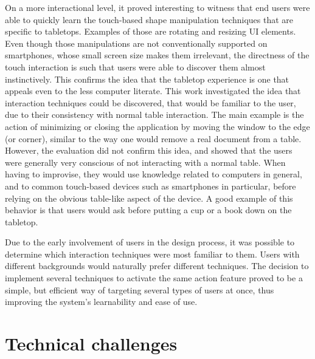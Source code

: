 On a more interactional level, it proved interesting to witness that end users were able to quickly learn the touch-based shape manipulation techniques that are specific to tabletops.
Examples of those are rotating and resizing UI elements.
Even though those manipulations are not conventionally supported on smartphones, whose small screen size makes them irrelevant, the directness of the touch interaction is such that users were able to discover them almost instinctively.
This confirms the idea that the tabletop experience is one that appeals even to the less computer literate.
This work investigated the idea that interaction techniques could be discovered, that would be familiar to the user, due to their consistency with normal table interaction.
The main example is the action of minimizing or closing the application by moving the window to the edge (or corner), similar to the way one would remove a real document from a table.
However, the evaluation did not confirm this idea, and showed that the users were generally very conscious of not interacting with a normal table.
When having to improvise, they would use knowledge related to computers in general, and to common touch-based devices such as smartphones in particular, before relying on the obvious table-like aspect of the device.
A good example of this behavior is that users would ask before putting a cup or a book down on the tabletop.



Due to the early involvement of users in the design process, it was possible to determine which interaction techniques were most familiar to them.
Users with different backgrounds would naturally prefer different techniques.
The decision to implement several techniques to activate the same action feature proved to be a simple, but efficient way of targeting several types of users at once, thus improving the system's learnability and ease of use.

\section{Technical challenges}
\label{disc:technical}

